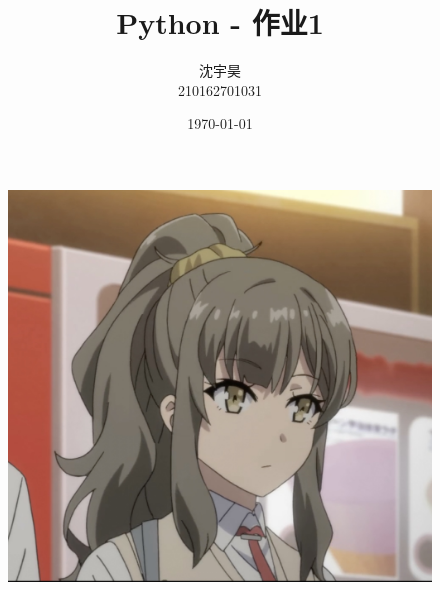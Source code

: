 \documentclass{beamer}
\author{沈宇昊 \\ 210162701031}
\title{Python - 作业1}
\date{\today}
\institute{兰州理工大学}
\begin{document}

  

  \begin{frame}[plain]
    \maketitle
    \begin{figure}[htbp] %
    \centering %
    \includegraphics[width=0.3\textheight,height=0.2\textwidth]{new- 2.jpg} %
    \end{figure}
  \end{frame}

  
\end{document}
